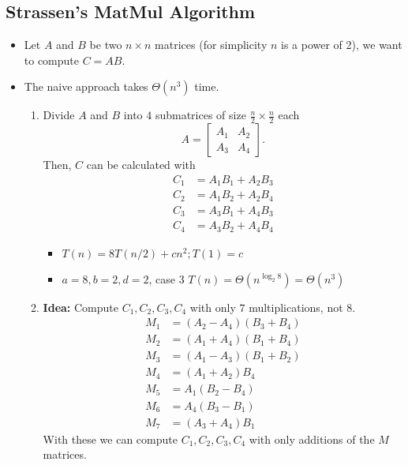 \documentclass[a4paper]{article}
\begin{document}
\subsection{Strassen's MatMul Algorithm}
\begin{itemize}
    \item Let $A$ and $B$ be two $n\times n$ matrices (for simplicity $n$ is a power of 2), we want to compute $C=AB$.
    \item The naive approach takes $\Theta(n^3)$ time.
    \begin{enumerate}
        \item Divide $A$ and $B$ into $4$ submatrices of size $\frac{n}{2}\times\frac{n}{2}$ each
        \begin{equation}
            A = \begin{bmatrix}
                A_{1} & A_{2}\\
                A_{3} & A_{4}
            \end{bmatrix}.
        \end{equation}
        Then, $C$ can be calculated with
        \begin{align}
            C_1 &= A_1B_1 + A_2B_3\\
            C_2 &= A_1B_2 + A_2B_4\\
            C_3 &= A_3B_1 + A_4B_3\\
            C_4 &= A_3B_2 + A_4B_4
        \end{align}
        \begin{itemize}
            \item $T(n)=8T(n/2)+cn^2; T(1)=c$
            \item $a=8,b=2,d=2$, case 3 $T(n)=\Theta(n^{\log_2 8})=\Theta(n^3)$
        \end{itemize}
        \item \textbf{Idea:} Compute $C_1,C_2,C_3,C_4$ with only $7$ multiplications, not 8.
        \begin{align}
            M_1 &= (A_2-A_4)(B_3+B_4)\\
            M_2 &= (A_1+A_4)(B_1+B_4)\\
            M_3 &= (A_1-A_3)(B_1+B_2)\\
            M_4 &= (A_1+A_2)B_4\\
            M_5 &= A_1(B_2-B_4)\\
            M_6 &= A_4(B_3-B_1)\\
            M_7 &= (A_3+A_4)B_1
        \end{align}
        With these we can compute $C_1,C_2,C_3,C_4$ with only additions of the $M$ matrices.

\end{enumerate}
\end{itemize}
\end{document}
